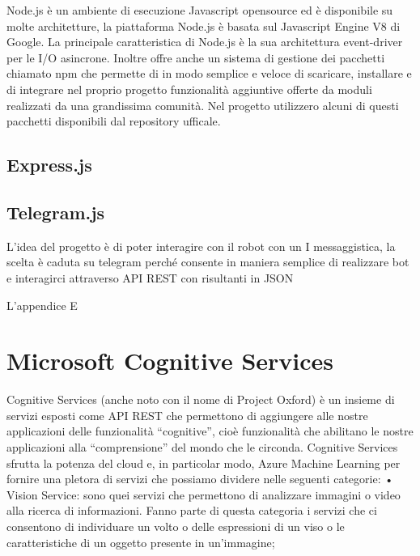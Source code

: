 Node.js è un ambiente di esecuzione Javascript  opensource ed è disponibile su molte architetture, la piattaforma Node.js è basata sul Javascript Engine V8 di Google.
La principale caratteristica di Node.js è la sua  architettura event-driver per le I/O asincrone.
Inoltre offre anche un sistema di gestione dei pacchetti chiamato npm che permette di  in modo semplice e veloce di scaricare, installare e di integrare nel proprio progetto funzionalità aggiuntive offerte da moduli realizzati da una grandissima comunità.
Nel progetto utilizzero alcuni di questi pacchetti disponibili dal repository ufficale.


\subsection{Express.js}

\subsection{Telegram.js}
L’idea del progetto è di poter interagire con il robot con un I messaggistica, la scelta è caduta su telegram perché consente in maniera semplice di realizzare bot e interagirci attraverso API REST con risultanti in JSON

L'appendice E 

\section{Microsoft Cognitive Services} 
Cognitive Services (anche noto con il nome di Project Oxford) è un insieme di servizi esposti come API REST che permettono di aggiungere alle nostre applicazioni delle funzionalità “cognitive”, cioè funzionalità che abilitano le nostre applicazioni alla “comprensione” del mondo che le circonda.
Cognitive Services sfrutta la potenza del cloud e, in particolar modo, Azure Machine Learning per fornire una pletora di servizi che possiamo dividere nelle seguenti categorie:
•	Vision Service: sono quei servizi che permettono di analizzare immagini o video alla ricerca di informazioni. Fanno parte di questa categoria i servizi che ci consentono di individuare un volto o delle espressioni di un viso o le caratteristiche di un oggetto presente in un’immagine;



